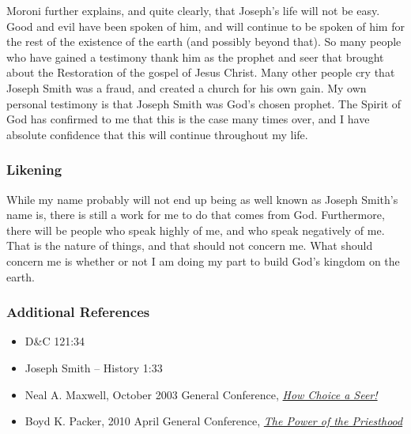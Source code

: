 \documentclass[12pt]{report}
\begin{document}
Moroni further explains, and quite clearly, that Joseph's life will not be easy.  Good and evil have been spoken of him, and will continue to be spoken of him for the rest of the existence of the earth (and possibly beyond that). So many people who have gained a testimony thank him as the prophet and seer that brought about the Restoration of the gospel of Jesus Christ.  Many other people cry that Joseph Smith was a fraud, and created a church for his own gain.  My own personal testimony is that Joseph Smith was God's chosen prophet.  The Spirit of God has confirmed to me that this is the case many times over, and I have absolute confidence that this will continue throughout my life.

\subsubsection{Likening\label{js:likening6}}
While my name probably will not end up being as well known as Joseph Smith's name is, there is still a work for me to do that comes from God.  Furthermore, there will be people who speak highly of me, and who speak negatively of me. That is the nature of things, and that should not concern me.  What should concern me is whether or not I am doing my part to build God's kingdom on the earth.

\subsubsection{Additional References\label{js:references6}}
\begin{itemize}
\item D\&C 121:34
\item Joseph Smith -- History 1:33
\item Neal A. Maxwell, October 2003 General Conference, \href{https://www.lds.org/general-conference/2003/10/how-choice-a-seer?lang=eng}{\emph{How Choice a Seer!}}
\item Boyd K. Packer, 2010 April General Conference, \href{https://www.lds.org/general-conference/2010/04/the-power-of-the-priesthood?lang=eng}{\emph{The Power of the Priesthood}}
\end{itemize}

\end{document}
